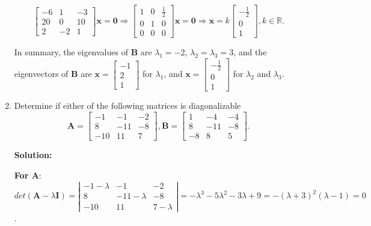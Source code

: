\documentclass[12pt, a4paper, UTF8]{ctexart}
\begin{document}
\begin{enumerate}
		\begin{equation*}
			\begin{bmatrix}
				-6	& 1  & -3\\
				20	& 0  & 10\\
				2	& -2 & 1
			\end{bmatrix}\bm{x} = \bm{0} \Longrightarrow \begin{bmatrix}
				1 & 0 & \frac{1}{2}\\
				0 & 1 & 0\\
				0 & 0 & 0
			\end{bmatrix}\bm{x} = \bm{0} \Longrightarrow \bm{x} = k \begin{bmatrix}
				-\frac{1}{2} \\ 0 \\ 1
			\end{bmatrix}, k \in \mathbb{R}.
		\end{equation*}

		In summary, the eigenvalues of $\bm{B}$ are $\lambda_{1}=-2$, $\lambda_{2}=\lambda_{3}=3$, and the eigenvectors of $\bm{B}$ are 
		$ \bm{x} = \begin{bmatrix}
			-1 \\ 2 \\ 1
		\end{bmatrix}$ for $\lambda_1$, and 
		$\bm{x} = \begin{bmatrix}
			-\frac{1}{2} \\ 0 \\ 1
		\end{bmatrix}$ for $\lambda_2$ and $\lambda_3$.

		\item
		Determine if either of the following matrices is diagonalizable
		$$\bm{A}=
			\begin{bmatrix}
			-1 & -1 & -2 \\
			8 & -11 & -8 \\
			-10 & 11 & 7 
			\end{bmatrix}
		,
		\bm{B}=
			\begin{bmatrix}
			1 & -4 & -4 \\
			8 & -11 & -8 \\
			-8 & 8 & 5 
			\end{bmatrix}.
		$$

		\textbf{Solution:}
		
		\textbf{For $\bm{A}$}:
		\begin{equation*}
			det(\bm{A}-\lambda \bm{I})= 
			\left|\begin{matrix} 
				-1-\lambda & -1 & -2 \\ 
				8 & -11-\lambda  & -8 \\ 
				-10 & 11 & 7-\lambda 
			\end{matrix} \right| =-\lambda^3-5\lambda^2-3\lambda+9=-(\lambda +3)^2(\lambda -1)=0
		\end{equation*}.


\end{enumerate}
\end{document}
